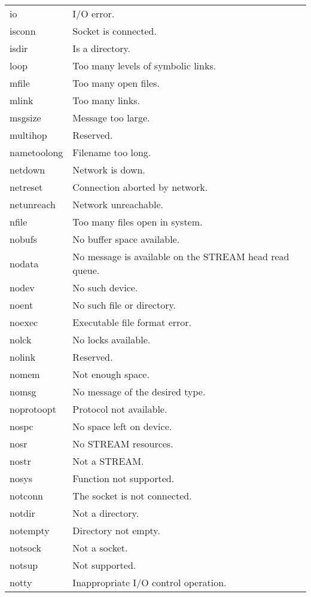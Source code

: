 \begin{center}
\begin{longtable}{@{\ttfamily}lp{}}
   io					& I/O error.\\
   isconn				& Socket is connected.\\
   isdir				& Is a directory.\\
   loop			  & Too many levels of symbolic links.\\
   mfile				& Too many open files.\\
   mlink				& Too many links.\\
   msgsize				& Message too large.\\
   multihop				& Reserved.\\
   nametoolong			& Filename too long.\\
   netdown				& Network is down.\\
   netreset			      & Connection aborted by network.\\
   netunreach				& Network unreachable.\\
   nfile			      & Too many files open in system.\\
   nobufs				& No buffer space available.\\
   nodata & No message is available on the STREAM head read queue. \\
   nodev				& No such device.\\
   noent				& No such file or directory.\\
   noexec			       & Executable file format error.\\
   nolck				& No locks available.\\
   nolink				& Reserved.\\
   nomem				& Not enough space.\\
   nomsg			     & No message of the desired type.\\
   noprotoopt				& Protocol not available.\\
   nospc				& No space left on device.\\
   nosr				& No STREAM resources. \\
   nostr				&  Not a STREAM. \\
   nosys				& Function not supported.\\
   notconn				& The socket is not connected.\\
   notdir				& Not a directory.\\
   notempty				& Directory not empty.\\
   notsock				& Not a socket.\\
   notsup				& Not supported.\\
   notty			& Inappropriate I/O control operation.\\

\end{longtable}
\end{center}
